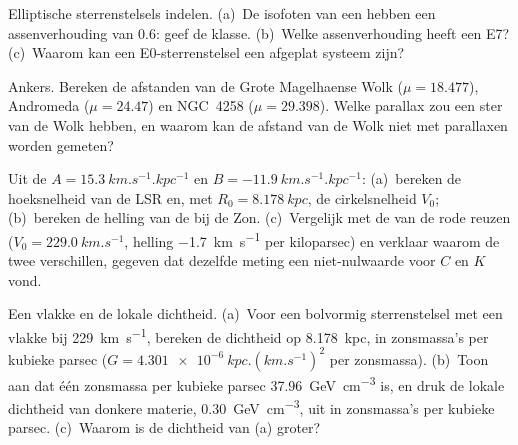 \begin{exercise}[$\star$]\label{exo:b3:milky-way-galaxies:3}
Elliptische sterrenstelsels indelen. (a)~De isofoten van een  hebben een
assenverhouding van 0.6: geef de klasse. (b)~Welke assenverhouding heeft een E7?
(c)~Waarom kan een E0-sterrenstelsel een afgeplat systeem zijn?
\end{exercise}

\begin{exercise}[$\star$]\label{exo:b3:milky-way-galaxies:4}
Ankers. Bereken de afstanden van de Grote Magelhaense Wolk
($\mu = 18.477$), Andromeda ($\mu = 24.47$) en NGC~4258
($\mu = 29.398$). Welke parallax zou een ster van de Wolk hebben, en waarom
kan de afstand van de Wolk niet met parallaxen worden gemeten?
\end{exercise}

\begin{exercise}[$\star\star$]\label{exo:b3:milky-way-galaxies:5}
Uit de  $A = \qty{15.3}{km.s^{-1}.kpc^{-1}}$ en
$B = \qty{-11.9}{km.s^{-1}.kpc^{-1}}$: (a)~bereken de hoeksnelheid van
de LSR en, met $R_0 = \qty{8.178}{kpc}$, de cirkelsnelheid $V_0$;
(b)~bereken de helling van de  bij de Zon. (c)~Vergelijk
met de  van de rode reuzen ($V_0 = \qty{229.0}{km.s^{-1}}$,
helling \qty{-1.7}{km.s^{-1}} per kiloparsec) en verklaar waarom de twee
verschillen, gegeven dat dezelfde meting een niet-nulwaarde voor $C$ en $K$ vond.
\end{exercise}

\begin{exercise}[$\star\star$]\label{exo:b3:milky-way-galaxies:6}
Een vlakke  en de lokale dichtheid. (a)~Voor een bolvormig sterrenstelsel
met een vlakke  bij \qty{229}{km.s^{-1}}, bereken de dichtheid op
\qty{8.178}{kpc}, in zonsmassa's per kubieke parsec
($G = \qty{4.301e-6}{kpc.(km.s^{-1})^2}$ per zonsmassa). (b)~Toon aan dat
één zonsmassa per kubieke parsec \qty{37.96}{GeV.cm^{-3}} is, en druk
de lokale dichtheid van donkere materie, \qty{0.30}{GeV.cm^{-3}}, uit in zonsmassa's
per kubieke parsec. (c)~Waarom is de dichtheid van (a) groter?
\end{exercise}

